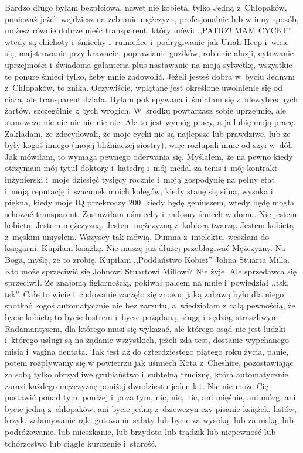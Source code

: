 \documentclass[oneside,polish,12pt,sfheadings]{mwbk}
\begin{document}
Bardzo długo byłam bezpłciowa, nawet nie kobieta, tylko Jedną z~Chłopaków,
ponieważ jeżeli wejdziesz na zebranie mężczyzn, profesjonalnie lub
w inny sposób, możesz równie dobrze nieść transparent, który mówi:
,,PATRZ! MAM CYCKI!'' wtedy są chichoty i~śmiechy i~rumieńce i~podrygiwanie
jak Uriah Heep i~wicie się, majstrowanie przy krawacie, poprawianie
guzików, robienie aluzji, cytowanie uprzejmości i~świadoma galanteria
plus nastawanie na moją sylwetkę, wszystkie te ponure śmieci tylko,
żeby mnie zadowolić. Jeżeli jesteś dobra w~byciu Jednym z~Chłopaków,
to znika. Oczywiście, wplątane jest określone uwolnienie się od ciała,
ale transparent działa. Byłam poklepywana i~śmiałam się z~niewybrednych
żartów, szczególnie z~tych wrogich. W~środku powtarzasz sobie uprzejmie,
ale stanowczo nie nie nie nie nie nie. Ale to jest wymóg pracy, a
ja lubię moją pracę. Zakładam, że zdecydowali, że moje cycki nie są
najlepsze lub prawdziwe, lub że były kogoś innego (mojej bliźniaczej
siostry), więc rozłupali mnie od szyi w~dół. Jak mówiłam, to wymaga
pewnego oderwania się. Myślałem, że na pewno kiedy otrzymam mój tytuł
doktory i~katedrę i~mój medal za tenis i~mój kontrakt inżynierski
i~moje dziesięć tysięcy rocznie i~moją gospodynię na pełny etat i~moją reputację i~szacunek moich kolegów, kiedy stanę się silna, wysoka
i piękna, kiedy moje IQ przekroczy 200, kiedy będę geniuszem, wtedy
będę mogła schować transparent. Zostawiłam uśmiechy i~radosny śmiech
w domu. Nie jestem kobietą. Jestem mężczyzną. Jestem mężczyzną z~kobiecą
twarzą. Jestem kobietą z~męskim umysłem. Wszyscy tak mówią. Dumna
z~intelektu, weszłam do księgarni. Kupiłam książkę. Nie muszę już
dłużej przebłagiwać Mężczyzny. Na Boga, myślę, że to zrobię. Kupiłam
,,Poddaństwo Kobiet'' Johna Stuarta Milla. Kto może sprzeciwić się
Johnowi Stuartowi Millowi? Nie żyje. Ale sprzedawca się sprzeciwił.
Ze znajomą figlarnością, pokiwał palcem na mnie i~powiedział ,,tsk,
tsk''. Całe to wicie i~cudowanie zaczęło się znowu, jaką zabawą było
dla niego spotkać kogoś automatycznie nie bez zarzutu, a~wiedziałam
z całą pewnością, że bycie kobietą to bycie lustrem i~bycie pożądaną,
sługą i~sędzią, straszliwym Radamantysem, dla którego musi się wykazać,
ale którego osąd nie jest ludzki i~którego usługi są na żądanie wszystkich,
jeżeli zda test, dostanie wypchanego misia i~vagina dentata. Tak jest
aż do czterdziestego piątego roku życia, panie, potem rozpływamy się
w powietrzu jak uśmiech Kota z~Cheshire, pozostawiając za sobą tylko
obrzydliwe grubiaństwo i~subtelną truciznę, która automatycznie zarazi
każdego mężczyznę poniżej dwudziestu jeden lat. Nic nie może Cię postawić
ponad tym, poniżej i~poza tym, nic, nic, nic, ani mięśnie, ani mózg,
ani bycie jedną z~chłopaków, ani bycie jedną z~dziewczyn czy pisanie
książek, listów, krzyk, załamywanie rąk, gotowanie sałaty lub bycie
za wysoką, lub za niską, lub podróżowanie, lub mieszkanie, lub brzydota
lub trądzik lub niepewność lub tchórzostwo lub ciągłe kurczenie i~starość.
\end{document}
